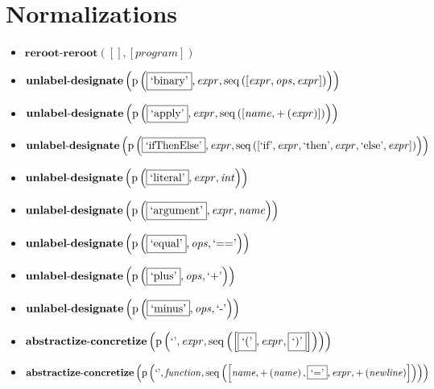 \section{Normalizations}
{\footnotesize\begin{itemize}
\item $\mathbf{reroot\text{-}reroot}\left([],[\mathit{program}]\right)$
\item $\mathbf{unlabel\text{-}designate}\\\left(\mathrm{p}\left(\fbox{\text{`binary'}},\mathit{expr},\mathrm{seq}\left(\left[\mathit{expr}, \mathit{ops}, \mathit{expr}\right]\right)\right)\right)$
\item $\mathbf{unlabel\text{-}designate}\\\left(\mathrm{p}\left(\fbox{\text{`apply'}},\mathit{expr},\mathrm{seq}\left(\left[\mathit{name}, {+}\left(\mathit{expr}\right)\right]\right)\right)\right)$
\item $\mathbf{unlabel\text{-}designate}\\\left(\mathrm{p}\left(\fbox{\text{`ifThenElse'}},\mathit{expr},\mathrm{seq}\left(\left[\text{`if'}, \mathit{expr}, \text{`then'}, \mathit{expr}, \text{`else'}, \mathit{expr}\right]\right)\right)\right)$
\item $\mathbf{unlabel\text{-}designate}\\\left(\mathrm{p}\left(\fbox{\text{`literal'}},\mathit{expr},\mathit{int}\right)\right)$
\item $\mathbf{unlabel\text{-}designate}\\\left(\mathrm{p}\left(\fbox{\text{`argument'}},\mathit{expr},\mathit{name}\right)\right)$
\item $\mathbf{unlabel\text{-}designate}\\\left(\mathrm{p}\left(\fbox{\text{`equal'}},\mathit{ops},\text{`=='}\right)\right)$
\item $\mathbf{unlabel\text{-}designate}\\\left(\mathrm{p}\left(\fbox{\text{`plus'}},\mathit{ops},\text{`+'}\right)\right)$
\item $\mathbf{unlabel\text{-}designate}\\\left(\mathrm{p}\left(\fbox{\text{`minus'}},\mathit{ops},\text{`-'}\right)\right)$
\item $\mathbf{abstractize\text{-}concretize}\\\left(\mathrm{p}\left(\text{`'},\mathit{expr},\mathrm{seq}\left(\left[\fbox{$\text{`('}$}, \mathit{expr}, \fbox{$\text{`)'}$}\right]\right)\right)\right)$
\item $\mathbf{abstractize\text{-}concretize}\\\left(\mathrm{p}\left(\text{`'},\mathit{function},\mathrm{seq}\left(\left[\mathit{name}, {+}\left(\mathit{name}\right), \fbox{$\text{`='}$}, \mathit{expr}, {+}\left(\mathit{newline}\right)\right]\right)\right)\right)$

\end{itemize}}
